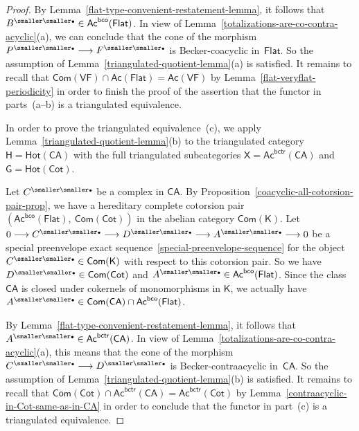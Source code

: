 \documentclass[12pt,a4paper]{amsart}
\newcommand{\+}{\nobreakdash-}
\renewcommand{\:}{\colon}
\newcommand{\rarrow}{\longrightarrow}
\newcommand{\bu}{{\text{\smaller\smaller$\scriptstyle\bullet$}}}
\newcommand{\sG}{\mathsf G}
\newcommand{\sH}{\mathsf H}
\newcommand{\sK}{\mathsf K}
\newcommand{\sX}{\mathsf X}
\newcommand{\VF}{\mathsf{VF}}
\newcommand{\CA}{\mathsf{CA}}
\newcommand{\Flat}{\mathsf{Flat}}
\newcommand{\Cot}{\mathsf{Cot}}
\newcommand{\Hot}{\mathsf{Hot}}
\newcommand{\Com}{\mathsf{Com}}
\newcommand{\Ac}{\mathsf{Ac}}
\newcommand{\bco}{\mathsf{bco}}
\newcommand{\bctr}{\mathsf{bctr}}
\theoremstyle{plain}
\theoremstyle{definition}
\begin{document}
\begin{proof}
 By Lemma~\ref{flat-type-convenient-restatement-lemma}, it follows
that $B^\bu\in\Ac^\bco(\Flat)$.
 In view of Lemma~\ref{totalizations-are-co-contra-acyclic}(a), we
can conclude that the cone of the morphism $P^\bu\rarrow F^\bu$ is
Becker-coacyclic in~$\Flat$.
 So the assumption of Lemma~\ref{triangulated-quotient-lemma}(a)
is satisfied.
 It remains to recall that $\Com(\VF)\cap\Ac(\Flat)=\Ac(\VF)$ by
Lemma~\ref{flat-veryflat-periodicity} in order to finish the proof of
the assertion that the functor in parts~(a\+-b) is a triangulated
equivalence.

 In order to prove the triangulated equivalence~(c), we apply
Lemma~\ref{triangulated-quotient-lemma}(b) to the triangulated
category $\sH=\Hot(\CA)$ with the full triangulated subcategories
$\sX=\Ac^\bctr(\CA)$ and $\sG=\Hot(\Cot)$.

 Let $C^\bu$ be a complex in $\CA$.
 By Proposition~\ref{coacyclic-all-cotorsion-pair-prop}, we have
a hereditary complete cotorsion pair $(\Ac^\bco(\Flat),\>\Com(\Cot))$
in the abelian category $\Com(\sK)$.
 Let $0\rarrow C^\bu\rarrow D^\bu\rarrow A^\bu\rarrow0$ be a special
preenvelope exact sequence~\eqref{special-preenvelope-sequence} for
the object $C^\bu\in\Com(\sK)$ with respect to this cotorsion pair.
 So we have $D^\bu\in\Com(\Cot)$ and $A^\bu\in\Ac^\bco(\Flat)$.
 Since the class $\CA$ is closed under cokernels of monomorphisms in
$\sK$, we actually have $A^\bu\in\Com(\CA)\cap\Ac^\bco(\Flat)$.

 By Lemma~\ref{flat-type-convenient-restatement-lemma}, it follows
that $A^\bu\in\Ac^\bctr(\CA)$.
 In view of Lemma~\ref{totalizations-are-co-contra-acyclic}(a), this
means that the cone of the morphism $C^\bu\rarrow D^\bu$ is
Becker-contraacyclic in~$\CA$.
 So the assumption of Lemma~\ref{triangulated-quotient-lemma}(b)
is satisfied.
 It remains to recall that $\Com(\Cot)\cap\Ac^\bctr(\CA)=
\Ac^\bctr(\Cot)$ by Lemma~\ref{contraacyclic-in-Cot-same-as-in-CA}
in order to conclude that the functor in part~(c) is a triangulated
equivalence.
\end{proof}
\end{document}
